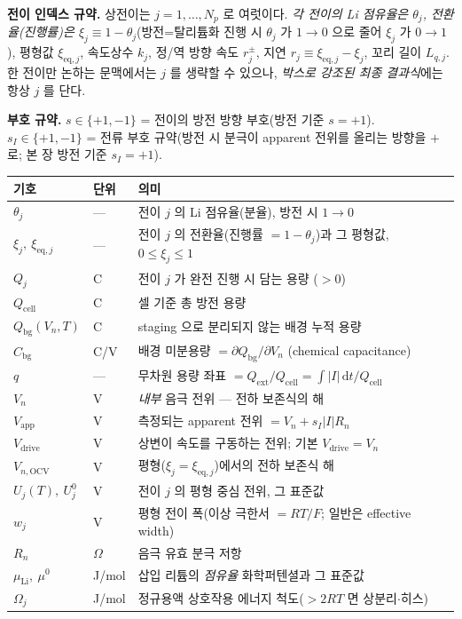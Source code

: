 \documentclass[11pt,a4paper]{article}
\newcommand{\dd}{\mathrm{d}}
\newcommand{\eq}{\mathrm{eq}}
\newcommand{\app}{\mathrm{app}}
\newcommand{\drive}{\mathrm{drive}}
\newcommand{\cell}{\mathrm{cell}}
\newcommand{\bg}{\mathrm{bg}}
\newcommand{\ext}{\mathrm{ext}}
\newcommand{\OCV}{\mathrm{OCV}}
\begin{document}
\textbf{전이 인덱스 규약.} 상전이는 $j=1,\dots,N_p$ 로 여럿이다. \emph{각 전이의 Li 점유율은 $\theta_j$, 전환율(진행률)은 $\xi_j\equiv1-\theta_j$}(방전=탈리튬화 진행 시 $\theta_j$ 가 $1\to0$ 으로 줄어 $\xi_j$ 가 $0\to1$), 평형값
$\xi_{\eq,j}$, 속도상수 $k_j$, 정/역 방향 속도 $r_j^\pm$, 지연 $r_j\equiv\xi_{\eq,j}-\xi_j$, 꼬리 길이
$L_{q,j}$. 한 전이만 논하는 문맥에서는 $j$ 를 생략할 수 있으나, \emph{박스로 강조된 최종 결과식}에는 항상 $j$ 를
단다.

\textbf{부호 규약.} $s\in\{+1,-1\}$ = 전이의 방전 방향 부호(방전 기준 $s=+1$). $s_I\in\{+1,-1\}$ = 전류 부호
규약(방전 시 분극이 apparent 전위를 올리는 방향을 $+$ 로; 본 장 방전 기준 $s_I=+1$).

\begin{longtable}{p{} p{} p{}}
\toprule 기호 & 단위 & 의미 \\ \midrule \endhead
$\theta_j$ & --- & 전이 $j$ 의 Li 점유율(분율), 방전 시 $1\to0$ \\
$\xi_j,\ \xi_{\eq,j}$ & --- & 전이 $j$ 의 전환율(진행률 $=1-\theta_j$)과 그 평형값, $0\le\xi_j\le1$ \\
$Q_j$ & C & 전이 $j$ 가 완전 진행 시 담는 용량 ($>0$) \\
$Q_\cell$ & C & 셀 기준 총 방전 용량 \\
$Q_\bg(V_n,T)$ & C & staging 으로 분리되지 않는 배경 누적 용량 \\
$C_\bg$ & C/V & 배경 미분용량 $=\partial Q_\bg/\partial V_n$ (chemical capacitance) \\
$q$ & --- & 무차원 용량 좌표 $=Q_\ext/Q_\cell=\int|I|\,\dd t/Q_\cell$ \\
$V_n$ & V & \emph{내부} 음극 전위 — 전하 보존식의 해 \\
$V_\app$ & V & 측정되는 apparent 전위 $=V_n+s_I|I|R_n$ \\
$V_\drive$ & V & 상변이 속도를 구동하는 전위; 기본 $V_\drive=V_n$ \\
$V_{n,\OCV}$ & V & 평형($\xi_j=\xi_{\eq,j}$)에서의 전하 보존식 해 \\
$U_j(T),\ U_j^0$ & V & 전이 $j$ 의 평형 중심 전위, 그 표준값 \\
$w_j$ & V & 평형 전이 폭(이상 극한서 $=RT/F$; 일반은 effective width) \\
$R_n$ & $\Omega$ & 음극 유효 분극 저항 \\
$\mu_\mathrm{Li},\ \mu^0$ & J/mol & 삽입 리튬의 \emph{점유율} 화학퍼텐셜과 그 표준값 \\
$\Omega_j$ & J/mol & 정규용액 상호작용 에너지 척도($>2RT$ 면 상분리$\cdot$히스) \\

\end{longtable}
\end{document}

